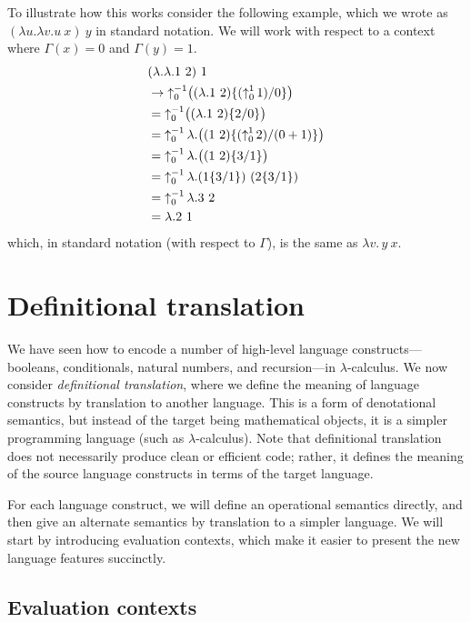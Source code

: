 To illustrate how this works consider the following example, which we wrote as
$(\lambda u.\lambda v.u\ x)\ y$ in standard notation. We will work with respect to a context where
$\Gamma(x)=0$ and $\Gamma(y)=1$.
\begin{align*}
  &(\lambda.\lambda.1\ 2)\ 1\\
  &\to{\sh{-1}{0}}\big((\lambda.1\ 2)\{({\sh{1}{0}}\,1)/0\}\big)\\
  &={\sh{-1}{0}}\big((\lambda.1\ 2)\{2/0\}\big)\\
  &={\sh{-1}{0}}\,\lambda.\big((1\ 2)\{({\sh{1}{0}}\,2)/(0+1)\}\big)\\
  &={\sh{-1}{0}}\,\lambda.\big((1\ 2)\{3/1\}\big)\\
  &={\sh{-1}{0}}\,\lambda.(1\{3/1\})\ (2\{3/1\})\\
  &={\sh{-1}{0}}\,\lambda.3\ 2\\
  &=\lambda.2\ 1
\end{align*}
which, in standard notation (with respect to $\Gamma$), is the same as $\lambda v.\,y\ x$.

\section{Definitional translation}

We have seen how to encode a number of high-level language constructs---booleans, conditionals,
natural numbers, and recursion---in $\lambda$-calculus. We now consider \emph{definitional
translation}, where we define the meaning of language constructs by translation to another
language. This is a form of denotational semantics, but instead of the target being mathematical
objects, it is a simpler programming language (such as $\lambda$-calculus). Note that definitional
translation does not necessarily produce clean or efficient code; rather, it defines the meaning of
the source language constructs in terms of the target language.

For each language construct, we will define an operational semantics directly, and then give an
alternate semantics by translation to a simpler language. We will start by introducing evaluation
contexts, which make it easier to present the new language features succinctly.

\subsection{Evaluation contexts}

